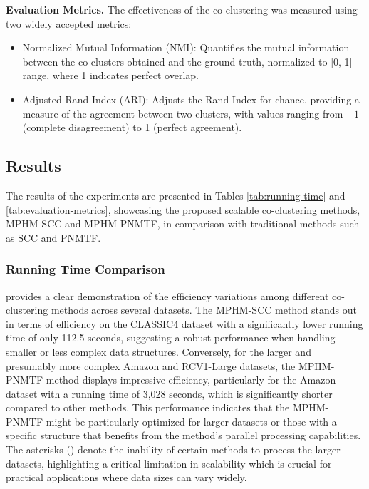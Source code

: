 \documentclass[journal]{IEEEtran}
\begin{document}
\textbf{Evaluation Metrics.}
The effectiveness of the co-clustering was measured using two widely accepted metrics:

\begin{itemize}
  \item Normalized Mutual Information (NMI): Quantifies the mutual information between the co-clusters obtained and the ground truth, normalized to [0, 1] range, where 1 indicates perfect overlap.
  \item Adjusted Rand Index (ARI): Adjusts the Rand Index for chance, providing a measure of the agreement between two clusters, with values ranging from $-1$ (complete disagreement) to 1 (perfect agreement).
\end{itemize}

\subsection{Results}
The results of the experiments are presented in Tables \ref{tab:running-time} and \ref{tab:evaluation-metrics}, showcasing the proposed scalable co-clustering methods, MPHM-SCC and MPHM-PNMTF, in comparison with traditional methods such as SCC and PNMTF.

\subsubsection{Running Time Comparison}
 provides a clear demonstration of the efficiency variations among different co-clustering methods across several datasets. The MPHM-SCC method stands out in terms of efficiency on the CLASSIC4 dataset with a significantly lower running time of only 112.5 seconds, suggesting a robust performance when handling smaller or less complex data structures. Conversely, for the larger and presumably more complex Amazon and RCV1-Large datasets, the MPHM-PNMTF method displays impressive efficiency, particularly for the Amazon dataset with a running time of 3,028 seconds, which is significantly shorter compared to other methods. This performance indicates that the MPHM-PNMTF might be particularly optimized for larger datasets or those with a specific structure that benefits from the method's parallel processing capabilities. The asterisks (\*) denote the inability of certain methods to process the larger datasets, highlighting a critical limitation in scalability which is crucial for practical applications where data sizes can vary widely.
\end{document}
